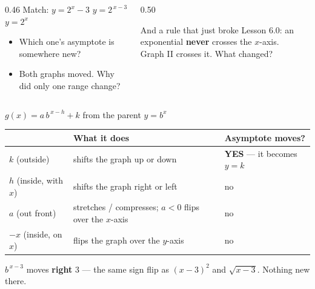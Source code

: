 \documentclass[aspectratio=169, 11pt]{beamer}
\begin{document}
\begin{frame}[t, plain]
\begin{columns}[T]
    \begin{column}{0.46\textwidth}
      \footnotesize
      Match: \quad $y=2^{x}-3$ \quad $y=2^{\,x-3}$ \quad $y=2^{x}$
      \begin{itemize}\setlength{\itemsep}{3pt}
        \item Which one's asymptote is somewhere new?
        \item Both graphs moved. Why did only one range change?
      \end{itemize}
    \end{column}
    \begin{column}{0.50\textwidth}
      \begin{block}{And a rule that just broke}
        Lesson 6.0: an exponential \textbf{never} crosses the $x$-axis. \\[3pt]
        Graph II crosses it. What changed?
      \end{block}
    \end{column}
  \end{columns}
\end{frame}

\begin{frame}[t, plain]
  \begin{center}
    \Large $g(x) = a\,b^{\,x-h} + k$ \qquad from the parent \qquad $y=b^{x}$
  \end{center}
  \vspace{6pt}
  \begin{center}
  \footnotesize
  \renewcommand{\arraystretch}{1.35}
  \begin{tabular}{|l|l|l|}
  \hline
  & \textbf{What it does} & \textbf{Asymptote moves?} \\
  \hline
  $k$ (outside) & shifts the graph up or down & \textbf{YES} --- it becomes $y=k$ \\
  $h$ (inside, with $x$) & shifts the graph right or left & no \\
  $a$ (out front) & stretches / compresses; $a<0$ flips over the $x$-axis & no \\
  $-x$ (inside, on $x$) & flips the graph over the $y$-axis & no \\
  \hline
  \end{tabular}
  \end{center}
  \vspace{8pt}
  \begin{center}
    {\footnotesize $b^{\,x-3}$ moves \textbf{right} $3$ --- the same sign flip as $(x-3)^{2}$ and
    $\sqrt{x-3}$. Nothing new there.}
  \end{center}
\end{frame}
\end{document}
